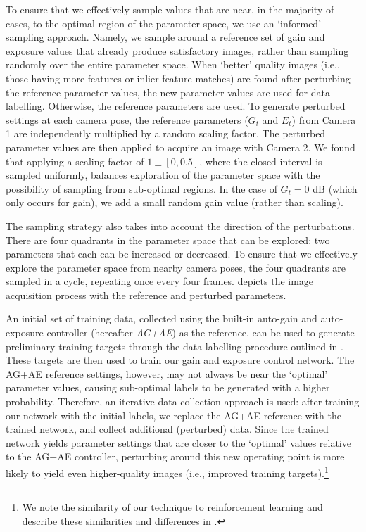 \documentclass[letterpaper, 10pt, journal, twoside]{IEEEtran}
\begin{document}
To ensure that we effectively sample values that are near, in the majority of cases, to the optimal region of the parameter space, we use an `informed' sampling approach. 
Namely, we sample around a reference set of gain and exposure values that already produce satisfactory images, rather than sampling randomly over the entire parameter space. 
When `better' quality images (i.e., those having more features or inlier feature matches) are found after perturbing the reference parameter values, the new parameter values are used for data labelling.
Otherwise, the reference parameters are used. 
To generate perturbed settings at each camera pose, the reference parameters ($G_t$ and $E_t$) from Camera 1 are independently multiplied by a random scaling factor. The perturbed parameter values are then applied to acquire an image with Camera 2. We found that applying a scaling factor of $1 \pm[0,0.5]$, where the closed interval is sampled uniformly, balances exploration of the parameter space with the possibility of sampling from sub-optimal regions.
In the case of $G_{t} = 0$ dB (which only occurs for gain), we add a small random gain value (rather than scaling). 

The sampling strategy also takes into account the direction of the perturbations. 
There are four quadrants in the parameter space that can be explored: two parameters that each can be increased or decreased.
To ensure that we effectively explore the parameter space from nearby camera poses, the four quadrants are sampled in a cycle, repeating once every four frames. 
 depicts the image acquisition process with the reference and perturbed parameters.

An initial set of training data, collected using the built-in auto-gain and auto-exposure  controller (hereafter \textit{AG+AE}) as the reference, can be used to generate preliminary training targets through the data labelling procedure outlined in . 
These targets are then used to train our gain and exposure control network. 
The AG+AE reference settings, however, may not always be near the `optimal' parameter values, causing sub-optimal labels to be generated with a higher probability.
Therefore, an iterative data collection approach is used: after training our network with the initial labels, we replace the AG+AE reference with the trained network, and collect additional (perturbed) data. 
Since the trained network yields parameter settings that are closer to the `optimal' values relative to the AG+AE controller, perturbing around this new operating point is more likely to yield even higher-quality images (i.e., improved training targets).\footnote{We note the similarity of our technique to reinforcement learning and describe these similarities and differences in .}
\end{document}
